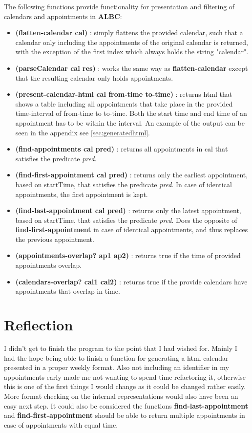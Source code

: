 \documentclass{IOS-Book-Article}
\begin{document}
The following functions provide functionality for presentation and filtering of calendars and appointments in \textbf{ALBC}:
\begin{itemize}
\item \textbf{(flatten-calendar cal)} : simply flattens the provided calendar, such that a calendar only including the appointments of the original calendar is returned, with the exception of the first index which always holds the string "calendar".
\item \textbf{(parseCalendar cal res)} : works the same way as \textbf{flatten-calendar} except that the resulting calendar only holds appointments. 
\item \textbf{(present-calendar-html cal from-time to-time)} : returns html that shows a table including all appointments that take place in the provided time-interval of from-time to to-time. Both the start time and end time of an appointment has to be within the interval. An example of the output can be seen in the appendix see \autoref{sec:generatedhtml}.
\item \textbf{(find-appointments cal pred)} : returns all appointments in cal that satisfies the predicate \textit{pred}.
\item \textbf{(find-first-appointment cal pred)} : returns only the earliest appointment, based on startTime, that satisfies the predicate \textit{pred}. In case of identical appointments, the first appointment is kept.
\item \textbf{(find-last-appointment cal pred)} : returns only the latest appointment, based on startTime, that satisfies the predicate \textit{pred}. Does the opposite of \textbf{find-first-appointment} in case of identical appointments, and thus replaces the previous appointment.
\item \textbf{(appointments-overlap? ap1 ap2)} : returns true if the time of provided appointments overlap.
\item \textbf{(calendars-overlap? cal1 cal2)} : returns true if the provide calendars have appointments that overlap in time.
\end{itemize}



\section{Reflection} \label{sec:reflection}
I didn't get to finish the program to the point that I had wished for. Mainly I had the hope being able to finish a function for generating a html calendar presented in a proper weekly format. Also not including an identifier in my appointments early made me not wanting to spend time refactoring it, otherwise this is one of the first things I would change as it could be changed rather easily. More format checking on the internal representations would also have been an easy next step. It could also be considered the functions \textbf{find-last-appointment} and \textbf{find-first-appointment} should be able to return multiple appointments in case of appointments with equal time.
\end{document}
